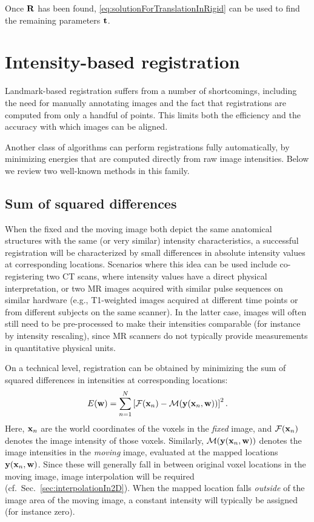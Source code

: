 \documentclass[10pt,twoside]{book}
\begin{document}
Once $\mathbf{R}$ has been found, \eqref{eq:solutionForTranslationInRigid} can be used to find the remaining parameters $\mathbf{t}$.



\section{Intensity-based registration}

% 
% 

Landmark-based registration suffers from a number of shortcomings, including the need for manually annotating images and the fact that registrations are computed from only a handful of points. This limits both the efficiency and the accuracy with which images can be aligned.

Another class of algorithms can perform registrations fully automatically, by minimizing energies that are computed directly from raw image intensities. Below we review two well-known methods in this family.

\subsection{Sum of squared differences}
\label{sec:ssd}


When the fixed and the moving image both depict the same anatomical structures with the same (or very similar) intensity characteristics, a successful registration will be characterized by small differences in absolute intensity values at corresponding locations. Scenarios where this idea can be used include co-registering two CT scans, where intensity values have a direct physical interpretation, or two MR images acquired with similar pulse sequences on similar hardware (e.g., T1-weighted images acquired at different time points or from different subjects on the same scanner).
In the latter case, 
images will often still need to be pre-processed to make their intensities comparable (for instance by intensity rescaling), since MR scanners do not typically provide measurements in quantitative physical units.

%
On a technical level,
registration can be obtained by minimizing the sum of squared differences in intensities at corresponding locations:
\begin{equation}
E(\mathbf{w}) 
=
\sum_{n=1}^N 
\left[ 
\mathcal{F}( \mathbf{x}_n ) - \mathcal{M}( \mathbf{y}( \mathbf{x}_n, \mathbf{w} ) )
\right]^2
.
\label{eq:SSD}
\end{equation}
Here, $\mathbf{x}_n$ are the world coordinates of the voxels in the \emph{fixed} image, and $\mathcal{F}(\mathbf{x}_n)$ denotes the image intensity of those voxels.
Similarly, $\mathcal{M}( \mathbf{y}( \mathbf{x}_n, \mathbf{w} ) )$ denotes the image intensities in the \emph{moving} image, evaluated at the mapped locations $\mathbf{y}( \mathbf{x}_n, \mathbf{w} )$. Since these will generally fall in between original voxel locations in the moving image, image interpolation will be required (cf.~Sec.~\ref{sec:interpolationIn2D}). When the mapped location falls \emph{outside} of the image area of the moving image, a constant intensity will typically be assigned (for instance zero).
\end{document}
